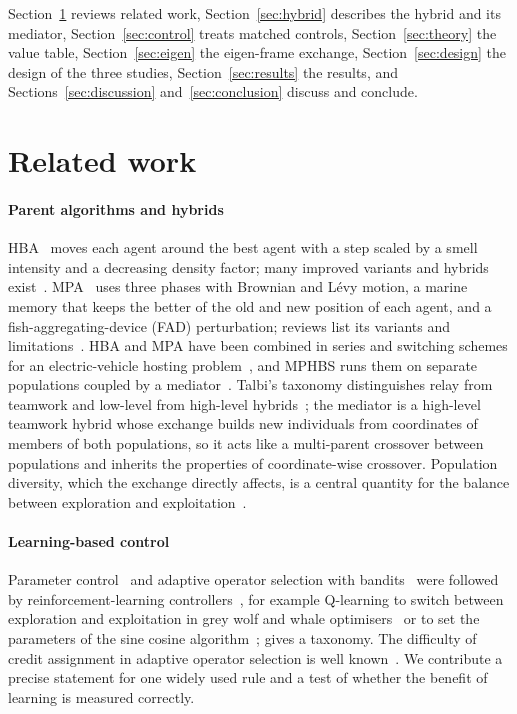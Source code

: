 Section~\ref{sec:related} reviews related work, Section~\ref{sec:hybrid} describes the hybrid and its mediator,
Section~\ref{sec:control} treats matched controls, Section~\ref{sec:theory} the value table,
Section~\ref{sec:eigen} the eigen-frame exchange, Section~\ref{sec:design} the design of the three studies,
Section~\ref{sec:results} the results, and Sections~\ref{sec:discussion} and~\ref{sec:conclusion} discuss and conclude.

\section{Related work}
\label{sec:related}

\paragraph{Parent algorithms and hybrids} HBA~\citep{hashim2022hba} moves each agent around the best agent with a step
scaled by a smell intensity and a decreasing density factor; many improved variants and hybrids exist~\citep{hassan2024hba}.
MPA~\citep{faramarzi2020mpa} uses three phases with Brownian and L\'evy motion, a marine memory that keeps the better of the
old and new position of each agent, and a fish-aggregating-device (FAD) perturbation; reviews list its variants and
limitations~\citep{albetar2023mpa}. HBA and MPA have been combined in series and switching schemes for an
electric-vehicle hosting problem~\citep{aldhaifallah2024mpahba}, and MPHBS runs them on separate populations coupled by a
mediator~\citep{flores2026mphbs}. Talbi's taxonomy distinguishes relay from teamwork and low-level from high-level
hybrids~\citep{talbi2002taxonomy,blum2011hybrid}; the mediator is a high-level teamwork hybrid whose exchange builds new
individuals from coordinates of members of both populations, so it acts like a multi-parent crossover between populations
and inherits the properties of coordinate-wise crossover. Population diversity, which the exchange directly affects, is a
central quantity for the balance between exploration and exploitation~\citep{crepinsek2013exploration,squillero2016diversity,
morales2020balance}.

\paragraph{Learning-based control} Parameter control~\citep{karafotias2015parameter} and adaptive operator selection with
bandits~\citep{fialho2010bandit} were followed by reinforcement-learning controllers~\citep{drugan2019rl,song2024rlea}, for
example Q-learning to switch between exploration and exploitation in grey wolf and whale optimisers~\citep{seyyedabbasi2021rl}
or to set the parameters of the sine cosine algorithm~\citep{hamad2022qlesca}; \citet{talbi2021ml} gives a taxonomy. The
difficulty of credit assignment in adaptive operator selection is well known~\citep{fialho2010bandit}. We contribute a
precise statement for one widely used rule and a test of whether the benefit of learning is measured correctly.

